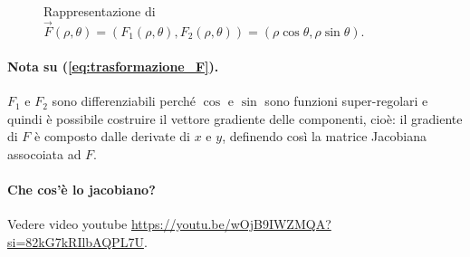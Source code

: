 \begin{figure}[ht]
	\centering
	\caption{Rappresentazione di $\vec{F}(\rho, \theta)=(F_1(\rho, \theta), F_2(\rho, \theta)) = (\rho\cos\theta, \rho\sin\theta)$.}
	\label{fig:applicazione_vettoriale_matrice_jacobiana}
\end{figure}

\paragraph{Nota su (\ref{eq:trasformazione_F}).} $F_1$ e $F_2$ sono differenziabili perché $\cos$ e $\sin$ sono funzioni super-regolari e quindi è possibile costruire il vettore gradiente delle componenti, cioè: il gradiente di $F$ è composto dalle derivate di $x$ e $y$, definendo così la matrice Jacobiana assocoiata ad $F$.

\paragraph{Che cos'è lo jacobiano?} Vedere video youtube \url{https://youtu.be/wOjB9IWZMQA?si=82kG7kRIlbAQPL7U}.


